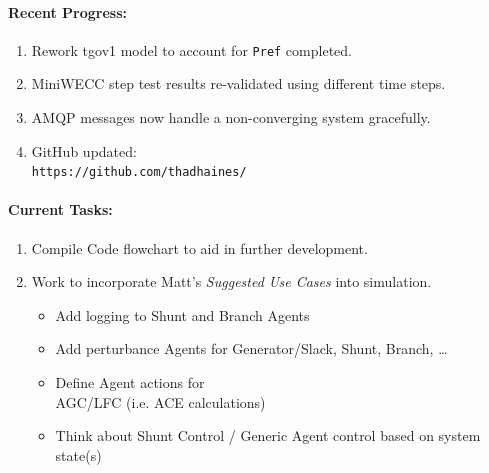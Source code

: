 \documentclass[12pt]{article}
\begin{document}
\begin{multicols}{2}
\raggedright
	\paragraph{Recent Progress:}
	\begin{enumerate}

		\item Rework tgov1 model to account for \verb|Pref| completed.

		\item MiniWECC step test results re-validated using different time steps.

		\item AMQP messages now handle a non-converging system gracefully.
		

		\item GitHub updated:\\
		\verb|https://github.com/thadhaines/|
		
	\end{enumerate}
\paragraph{Current Tasks:}
	\begin{enumerate}

		\item Compile Code flowchart to aid in further development.

		\item Work to incorporate Matt's \emph{Suggested Use Cases} into simulation.
		\begin{itemize}
		\item Add logging to Shunt and Branch Agents
		\item Add perturbance Agents for Generator/Slack, Shunt, Branch, \ldots
		\item Define Agent actions for \\ AGC/LFC (i.e. ACE calculations)
		\item Think about Shunt Control / Generic Agent control based on system state(s)
		\end{itemize}
		

	\end{enumerate}


\end{multicols}
\end{document}
